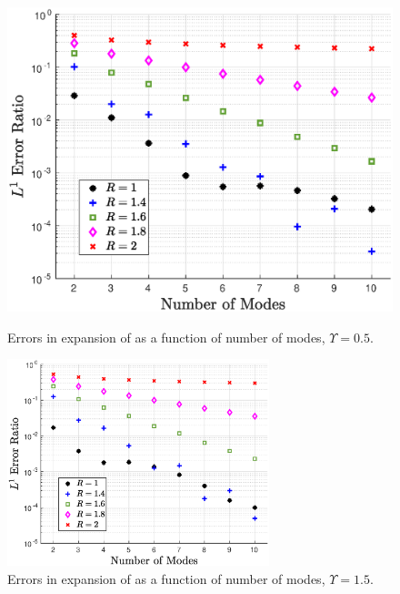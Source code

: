\begin{figure}[ht]
\begin{minipage}[b]{0.5\linewidth}
\centerline{\includegraphics[height=6.cm]{06-appendix/SpectralMethodBoltzmann/Figures/free_stream_f0_approx_Ups_5.eps}}
\caption{Errors in expansion of  as a function of number of modes, $\Upsilon=0.5$.}\label{fig:free_stream_f0_approx_Ups_5}
 \end{minipage}
 \hspace{0.5cm}
 \begin{minipage}[b]{0.5\linewidth}
\centerline{\includegraphics[height=6cm]{06-appendix/SpectralMethodBoltzmann/Figures/free_stream_f0_approx_Ups_1_5.eps}}
\caption{Errors in  expansion of  as a function of number of modes, $\Upsilon=1.5$.}\label{fig:free_stream_f0_approx_Ups_1_5}
\end{minipage}
\end{figure}



